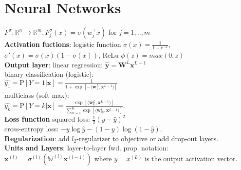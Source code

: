 \section{Neural Networks}
$F^\sigma:\mathbb{R}^n \rightarrow \mathbb{R}^m, F_j^\sigma(x) = \sigma(w_j^\top x)$ for $j=1,..,m$\\
\textbf{Activation fuctions}: logistic function $\sigma(x)=\frac{1}{1+e^{-x}}$, $\sigma'(x)=\sigma(x)(1-\sigma(x))$, ReLu $\phi(z)=max(0,z)$ \\
\textbf{Output layer}: linear regression: $\hat{\mathbf{y}} = \mathbf{W}^L\mathbf{x}^{L-1}$\\
binary classification (logistic):\\
$\hat{y_1} = \text{P}[Y=1|\mathbf{x}] = \frac{1}{1 + \exp[-\langle \mathbf{w}_1^L,\mathbf{x}^{L-1}\rangle]}$\\
multiclass (soft-max):\\
$\hat{y_k} = \text{P}[Y=k|\mathbf{x}]= \frac{\exp[\langle \mathbf{w}_k^L,\mathbf{x}^{L-1}\rangle]}{\sum_{m=1}^{K}{\exp[\langle \mathbf{w}_m^L, \mathbf{x}^{L-1}\rangle]}}$.\\
\textbf{Loss function} squared loss: $\frac{1}{2}(y - \hat{y})^2$\\
cross-entropy loss: $-y \log \hat{y} - (1-y)\log(1-\hat{y})$.\\
\textbf{Regularization}: add $l_2$-regularizer to objective or add drop-out layers. \\
\textbf{Units and Layers}: layer-to-layer fwd. prop. notation: $\mathbf{x}^{(l)} = \sigma^{(l)}\left(\mathbb{W}^{\left(l\right)}\mathbf{x}^{\left(l-1\right)}\right)$ 
where $y = x^{(L)}$ is the output activation vector.

